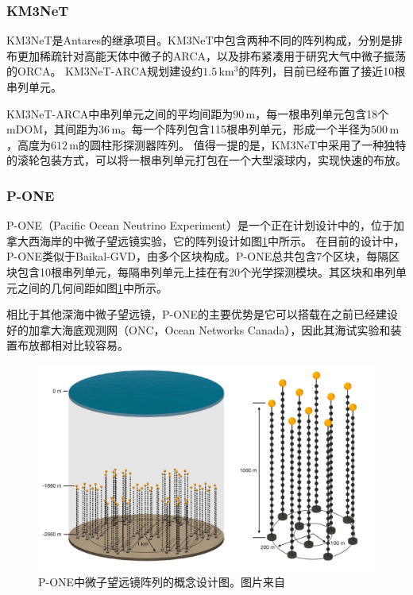 \subsubsection*{KM3NeT}

KM3NeT是Antares的继承项目\cite{KM3Net_letter_of_intent:2016}。KM3NeT中包含两种不同的阵列构成，分别是排布更加稀疏针对高能天体中微子的ARCA，以及排布紧凑用于研究大气中微子振荡的ORCA。
KM3NeT-ARCA规划建设约$1.5\,\mathrm{km^3}$的阵列，目前已经布置了接近10根串列单元。

KM3NeT-ARCA中串列单元之间的平均间距为$90\,\mathrm{m}$，每一根串列单元包含18个mDOM，其间距为$36\,\mathrm{m}$。每一个阵列包含115根串列单元，形成一个半径为$500\,\mathrm{m}$，高度为$612\,\mathrm{m}$的圆柱形探测器阵列。
值得一提的是，KM3NeT中采用了一种独特的滚轮包装方式，可以将一根串列单元打包在一个大型滚球内，实现快速的布放\cite{KM3NeT_deployment:2020}。

\subsubsection*{P-ONE}

P-ONE（Pacific Ocean Neutrino Experiment）是一个正在计划设计中的，位于加拿大西海岸的中微子望远镜实验\cite{P-ONE:2020, P-ONE_ICRC:2021}，它的阵列设计如图\ref{fig:P-One_array}中所示。
在目前的设计中，P-ONE类似于Baikal-GVD，由多个区块构成。P-ONE总共包含7个区块，每隔区块包含10根串列单元，每隔串列单元上挂在有20个光学探测模块。其区块和串列单元之间的几何间距如图\ref{fig:P-One_array}中所示。

相比于其他深海中微子望远镜，P-ONE的主要优势是它可以搭载在之前已经建设好的加拿大海底观测网（ONC，Ocean Networks Canada）\cite{P-ONE_ONC:2010}，因此其海试实验和装置布放都相对比较容易。

\begin{figure}[htb]
    \centering
    \includegraphics[width=0.8\linewidth]{img/P-One_array.png}
    \caption{P-ONE中微子望远镜阵列的概念设计图。图片来自\cite{P-ONE_ICRC:2021}}
    \label{fig:P-One_array}
\end{figure}


